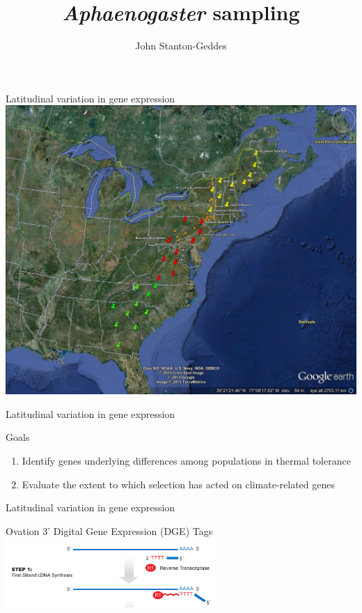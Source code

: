 \documentclass{beamer}
\title[]{\textit{Aphaenogaster} sampling}
\author{John Stanton-Geddes}
\institute{Department of Biology \\ University of Vermont}
\begin{document}
\begin{frame}
  \titlepage
\end{frame}


\begin{frame}{Latitudinal variation in gene expression}
	\includegraphics[width=\textwidth, height=\textheight, keepaspectratio]{Aphaenogaster2013_sampling_locations_20130313.jpg}
\end{frame}


\begin{frame}{Latitudinal variation in gene expression}
	\begin{block}{Goals}
		\begin{enumerate}
			\item Identify genes underlying differences among populations in thermal tolerance
			\item Evaluate the extent to which selection has acted on climate-related genes
		\end{enumerate}
	\end{block}
\end{frame}


\begin{frame}{Latitudinal variation in gene expression}
	\begin{center}
		\Large{Ovation 3' Digital Gene Expression (DGE) Tags}
		\includegraphics[width=8cm]{ovation_DGE.png}\\
	\end{center}
\end{frame}
\end{document}
